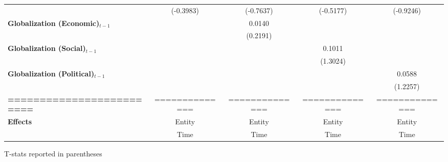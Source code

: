 \begin{center}
\begin{tabular}{lcccc}
\textbf{ }                         &   (-0.3983)    &    (-0.7637)     &    (-0.5177)     &    (-0.9246)      \\
\textbf{Globalization (Economic)$_{t-1}$}             &                &      0.0140      &                  &                   \\
\textbf{ }                         &                &     (0.2191)     &                  &                   \\
\textbf{Globalization (Social)$_{t-1}$}             &                &                  &      0.1011      &                   \\
\textbf{ }                         &                &                  &     (1.3024)     &                   \\
\textbf{Globalization (Political)$_{t-1}$}             &                &                  &                  &      0.0588       \\
\textbf{ }                         &                &                  &                  &     (1.2257)      \\
\textbf{=========================} & ============== &  ==============  &  ==============  &  ==============   \\
\textbf{Effects}                   &     Entity     &      Entity      &      Entity      &      Entity       \\
\textbf{}                          &      Time      &       Time       &       Time       &       Time        \\
\bottomrule
\end{tabular}
\end{center}

T-stats reported in parentheses
